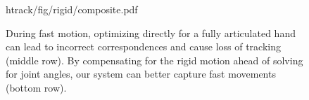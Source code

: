 \begin{figure}[t]
\centering
\begin{overpic} 
[width=\linewidth]
{htrack/fig/rigid/composite.pdf}
\putfilename
\end{overpic}
\vspace{0.5em}
\caption{
%
% 
During fast motion, optimizing directly for a fully articulated hand can lead to incorrect correspondences and cause loss of tracking (middle row). By compensating for the rigid motion ahead of solving for joint angles, our system can better capture fast movements (bottom row).
% 
}
\label{fig:rigid}
\end{figure}